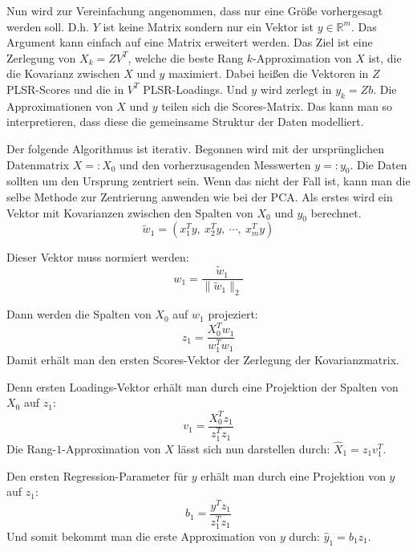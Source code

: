 \documentclass{article}
\newcommand{\R}[0]{\mathbb{R}}
\begin{document}
Nun wird zur Vereinfachung angenommen, dass nur eine Größe vorhergesagt werden soll.
D.h. $Y$ ist keine Matrix sondern nur ein Vektor ist $y \in \R^m$. Das Argument kann einfach auf eine Matrix erweitert werden.
Das Ziel ist eine Zerlegung von $X_k = ZV^T$, welche die beste Rang $k$-Approximation von $X$ ist, die die Kovarianz zwischen $X$ und $y$ maximiert.
Dabei heißen die Vektoren in $Z$ PLSR-Scores und die in $V^T$ PLSR-Loadings. Und $y$ wird zerlegt in $y_k = Zb$. 
Die Approximationen von $X$ und $y$ teilen sich die Scores-Matrix. Das kann man so interpretieren, dass diese die gemeinsame Struktur der Daten modelliert.

Der folgende Algorithmus ist iterativ. Begonnen wird mit der ursprünglichen Datenmatrix $X=:X_0$ und den vorherzusagenden Messwerten $y=:y_0$.
Die Daten sollten um den Ursprung zentriert sein. Wenn das nicht der Fall ist, kann man die selbe Methode zur Zentrierung anwenden wie bei der PCA.
Als erstes wird ein Vektor mit Kovarianzen zwischen den Spalten von $X_0$ und $y_0$ berechnet.
\begin{equation*}
    \tilde{w}_1 = (x_1^Ty, \: x_2^Ty, \: \cdots, \: x_m^Ty)
\end{equation*}

Dieser Vektor muss normiert werden:
\begin{equation*}
    w_1 = \frac{\tilde{w}_1}{\lVert \tilde{w}_1 \rVert_2}
\end{equation*}

Dann werden die Spalten von $X_0$ auf $w_1$ projeziert:
\begin{equation*}
    z_1 = \frac{X_0^Tw_1}{w_1^Tw_1}
\end{equation*}
Damit erhält man den ersten Scores-Vektor der Zerlegung der Kovarianzmatrix. 

Denn ersten Loadings-Vektor erhält man durch eine Projektion der Spalten von $X_0$ auf $z_1$:
\begin{equation*}
    v_1 = \frac{X_0^Tz_1}{z_1^Tz_1}
\end{equation*}
Die Rang-$1$-Approximation von $X$ lässt sich nun darstellen durch: $\hat{X}_1 = z_1v_1^T$.

Den ersten Regression-Parameter für $y$ erhält man durch eine Projektion von $y$ auf $z_1$:
\begin{equation*}
    b_1 = \frac{y^Tz_1}{z_1^Tz_1}
\end{equation*}
Und somit bekommt man die erste Approximation von $y$ durch: $\hat{y}_1 = b_1z_1$.
\end{document}

